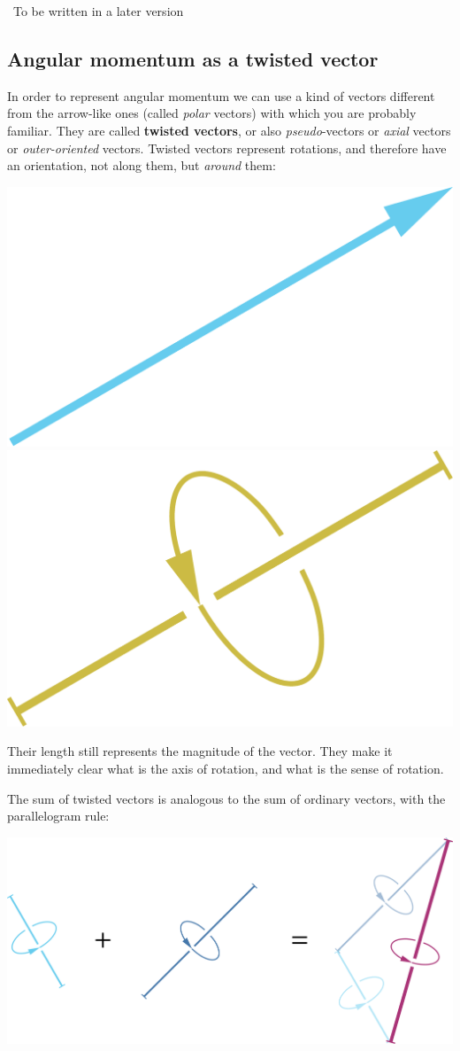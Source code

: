 \documentclass[a4paper,12pt,%
onecolumn,oneside,titlepage,%
british%
]{memoir}
\newcommand{\mynotew}[1]{{\footnotesize\color{midgrey}\faIcon{tools}\ #1}}
\renewcommand*{\|}[1][]{\nonscript\:#1\vert\nonscript\:\mathopen{}}
\begin{document}
\mynotew{To be written in a later version}

\subsection{Angular momentum as a twisted vector}
\label{sec:twisted_vec}

In order to represent angular momentum we can use a kind of vectors different from the arrow-like ones (called \emph{polar} vectors) with which you are probably familiar. They are called \textbf{twisted vectors}, or also \emph{pseudo}-vectors or \emph{axial} vectors or \emph{outer-oriented} vectors. Twisted vectors represent rotations, and therefore have an orientation, not along them, but \emph{around} them:
\begin{center}
\includegraphics[width=0.34\linewidth]{images/io-vector.pdf}%
\hspace*{0.12\linewidth}\includegraphics[width=0.34\linewidth]{images/oo-vector.pdf}%
%
\\\footnotesize
{}\hspace*{0.46\linewidth}
\end{center}
Their length still represents the magnitude of the vector. They make it immediately clear what is the axis of rotation, and what is the sense of rotation.

The sum of twisted vectors is analogous to the sum of ordinary vectors, with the parallelogram rule:
\begin{center}
\includegraphics[width=0.67\linewidth]{images/tvectorsum.pdf}%
\end{center}
\end{document}
